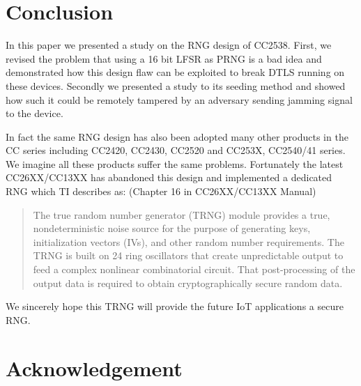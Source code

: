 \section{Conclusion}
In this paper we presented a study on the RNG design of CC2538. First, we revised the problem that using a 16 bit LFSR as PRNG is a bad idea and demonstrated how this design flaw can be exploited to break DTLS running on these devices. Secondly we presented a study to its seeding method and showed how such it could be remotely tampered by an adversary sending jamming signal to the device.

In fact the same RNG design has also been adopted many other products in the CC series including CC2420\cite{CC2420Manual}, CC2430\cite{CC2430Manual}, CC2520\cite{CC2520Manual} and CC253X, CC2540/41 series\cite{CC2530Manual}. We imagine all these products suffer the same problems. Fortunately the latest CC26XX/CC13XX\cite{CC26XXManual} has abandoned this design and implemented a dedicated RNG which TI describes as: (Chapter 16 in CC26XX/CC13XX Manual\cite{CC26XXManual})
\begin{quote}
The true random number generator (TRNG) module provides a true, nondeterministic noise source for the
purpose of generating keys, initialization vectors (IVs), and other random number requirements. The
TRNG is built on 24 ring oscillators that create unpredictable output to feed a complex nonlinear
combinatorial circuit. That post-processing of the output data is required to obtain cryptographically secure
random data.
\end{quote}

We sincerely hope this TRNG will provide the future IoT applications a secure RNG.

\section{Acknowledgement}